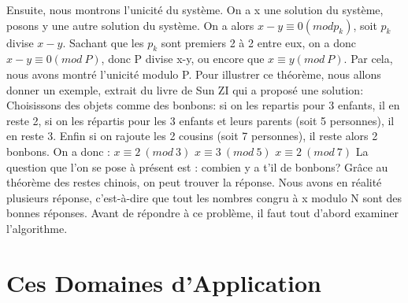 \documentclass[a4paper, 11pt]{report}
\begin{document}
Ensuite, nous montrons l'unicité du système. \newline
On a x une solution du système, posons y une autre solution du système. On a alors $x-y\equiv 0( mod p_k)$, soit $p_k$ divise $x-y$. Sachant que les $p_k$ sont premiers 2 à 2 entre eux, on a donc $x-y\equiv 0(mod \: P)$, donc P divise x-y, ou encore que $x\equiv y (mod \: P)$. Par cela, nous avons montré l'unicité modulo P.
\newline
\newline
\newline
\newline
\newline
Pour illustrer ce théorème, nous allons donner un exemple, extrait du livre de Sun ZI qui a proposé une solution:
\newline
Choisissons des objets comme des bonbons: si on les repartis pour 3 enfants, il en reste 2, si on les répartis
pour les 3 enfants et leurs parents (soit 5 personnes), il en reste 3. Enfin si on rajoute les 2 cousins
(soit 7 personnes), il reste alors 2 bonbons. On a donc :
\newline 
$ x\equiv 2 \: (mod \:  3)$ 
\newline
$ x\equiv 3 \: (mod \: 5)$
\newline
$ x\equiv 2 \:(mod\: 7)$
\newline
\newline 
La question que l'on se pose à présent est : combien y a t'il de bonbons?
\newline
Grâce au théorème des restes chinois, on peut trouver la réponse. Nous avons en réalité plusieurs réponse, c'est-à-dire que tout les nombres congru à x modulo N sont des bonnes réponses.
Avant de répondre à ce problème, il faut tout d'abord examiner l'algorithme.

\newpage
\section{Ces Domaines d'Application}



\newpage
\end{document}
